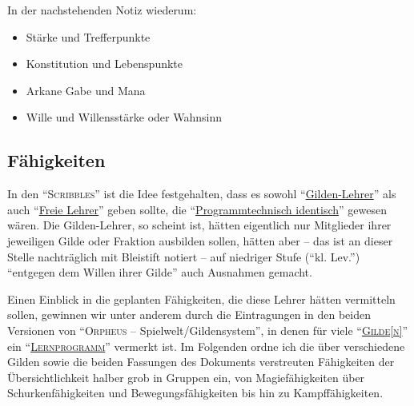 \documentclass[a5paper,pagesize,numbers=noenddot]{scrbook}
\begin{document}
\noindent In der nachstehenden Notiz wiederum:

\begin{itemize}
   \item Stärke und Trefferpunkte
   \item Konstitution und Lebenspunkte
   \item Arkane Gabe und Mana
   \item Wille und Willensstärke oder Wahnsinn %
\end{itemize}


\subsection{Fähigkeiten}\label{sec:orpheus_mechanik_faehigkeiten}
In den \enquote{\textsc{Scribbles}} ist die Idee festgehalten, dass es sowohl \enquote{\uline{Gilden-Lehrer}} als auch \enquote{\uline{Freie Lehrer}} geben sollte, die \enquote{\uline{Programmtechnisch identisch}} gewesen wären.
Die Gilden-Lehrer, so scheint ist, hätten eigentlich nur Mitglieder ihrer jeweiligen Gilde oder Fraktion ausbilden sollen, hätten aber -- das ist an dieser Stelle nachträglich mit Bleistift notiert -- auf niedriger Stufe (\enquote{kl. Lev.}) \enquote{entgegen dem Willen ihrer Gilde} auch Ausnahmen gemacht.\autocite[S.~15]{orpheus_b_scribbles}

Einen Einblick in die geplanten Fähigkeiten, die diese Lehrer hätten vermitteln sollen, gewinnen wir unter anderem durch die Eintragungen in den beiden Versionen von \enquote{\textsc{Orpheus} -- Spielwelt/Gildensystem}, in denen für viele \enquote{\textsc{\uline{Gilde[n]}}} ein \enquote{\textsc{\uline{Lernprogramm}}} vermerkt ist.
Im Folgenden ordne ich die über verschiedene Gilden sowie die beiden Fassungen des Dokuments verstreuten Fähigkeiten der Übersichtlichkeit halber grob in Gruppen ein, von Magiefähigkeiten über Schurkenfähigkeiten und Bewegungsfähigkeiten bis hin zu Kampffähigkeiten.
\end{document}
